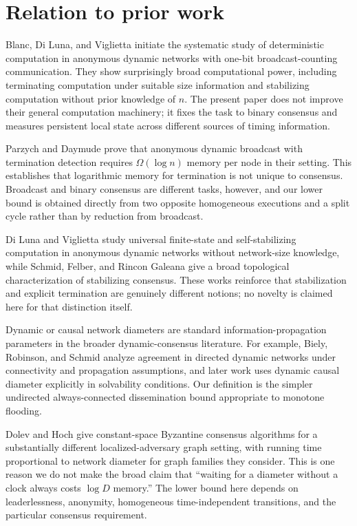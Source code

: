 \documentclass[11pt]{article}
\theoremstyle{remark}
\begin{document}
\section{Relation to prior work}
Blanc, Di Luna, and Viglietta \cite{blanc2026onebit} initiate the systematic study of deterministic computation in anonymous dynamic networks with one-bit broadcast-counting communication. They show surprisingly broad computational power, including terminating computation under suitable size information and stabilizing computation without prior knowledge of $n$. The present paper does not improve their general computation machinery; it fixes the task to binary consensus and measures persistent local state across different sources of timing information.

Parzych and Daymude \cite{parzych2024broadcast} prove that anonymous dynamic broadcast with termination detection requires $\Omega(\log n)$ memory per node in their setting. This establishes that logarithmic memory for termination is not unique to consensus. Broadcast and binary consensus are different tasks, however, and our lower bound is obtained directly from two opposite homogeneous executions and a split cycle rather than by reduction from broadcast.

Di Luna and Viglietta \cite{diluna2026finite} study universal finite-state and self-stabilizing computation in anonymous dynamic networks without network-size knowledge, while Schmid, Felber, and Rincon Galeana \cite{schmid2026topological} give a broad topological characterization of stabilizing consensus. These works reinforce that stabilization and explicit termination are genuinely different notions; no novelty is claimed here for that distinction itself.

Dynamic or causal network diameters are standard information-propagation parameters in the broader dynamic-consensus literature. For example, Biely, Robinson, and Schmid \cite{biely2012agreement} analyze agreement in directed dynamic networks under connectivity and propagation assumptions, and later work uses dynamic causal diameter explicitly in solvability conditions. Our definition is the simpler undirected always-connected dissemination bound appropriate to monotone flooding.

Dolev and Hoch \cite{dolevhoch2008} give constant-space Byzantine consensus algorithms for a substantially different localized-adversary graph setting, with running time proportional to network diameter for graph families they consider. This is one reason we do not make the broad claim that ``waiting for a diameter without a clock always costs $\log D$ memory.'' The lower bound here depends on leaderlessness, anonymity, homogeneous time-independent transitions, and the particular consensus requirement.
\end{document}
